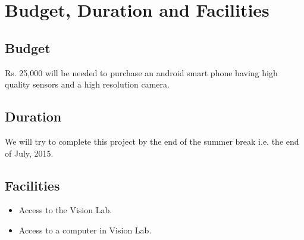 \documentclass{article}
\begin{document}
	\section{Budget, Duration and Facilities}	
		\subsection{Budget}
			Rs. 25,000 will be needed to purchase an android smart phone having high quality sensors and a high resolution camera.
		\subsection{Duration}
			We will try to complete this project by the end of the summer break i.e. the end of July, 2015. 
		\subsection{Facilities}
		    \begin{itemize}
		    \item Access to the Vision Lab.
		    \item Access to a computer in Vision Lab.
		    \end{itemize}
\end{document}
